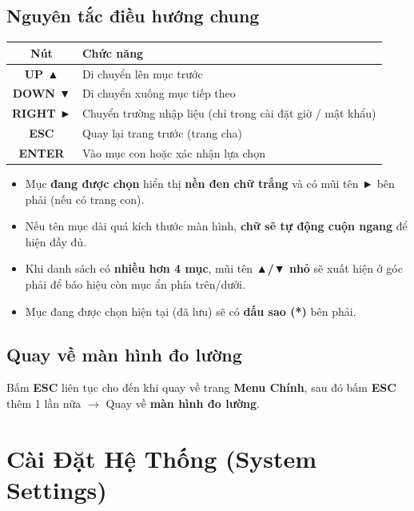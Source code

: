 \documentclass[12pt,a4paper]{article}
\begin{document}
\subsection{Nguyên tắc điều hướng chung}
\begin{table}[H]
\centering
\begin{tabularx}{\textwidth}{|c|X|}
\hline
\textbf{Nút} & \textbf{Chức năng} \\ \hline
\textbf{UP ▲} & Di chuyển lên mục trước \\ \hline
\textbf{DOWN ▼} & Di chuyển xuống mục tiếp theo \\ \hline
\textbf{RIGHT ►} & Chuyển trường nhập liệu (chỉ trong cài đặt giờ / mật khẩu) \\ \hline
\textbf{ESC} & Quay lại trang trước (trang cha) \\ \hline
\textbf{ENTER} & Vào mục con hoặc xác nhận lựa chọn \\ \hline
\end{tabularx}
\end{table}

\begin{tipbox}
\begin{itemize}[label={-}]
    \item Mục \textbf{đang được chọn} hiển thị \textbf{nền đen chữ trắng} và có mũi tên \textbf{►} bên phải (nếu có trang con).
    \item Nếu tên mục dài quá kích thước màn hình, \textbf{chữ sẽ tự động cuộn ngang} để hiện đầy đủ.
    \item Khi danh sách có \textbf{nhiều hơn 4 mục}, mũi tên \textbf{▲/▼ nhỏ} sẽ xuất hiện ở góc phải để báo hiệu còn mục ẩn phía trên/dưới.
    \item Mục đang được chọn hiện tại (đã lưu) sẽ có \textbf{dấu sao (*)} bên phải.
\end{itemize}
\end{tipbox}

\subsection{Quay về màn hình đo lường}
Bấm \textbf{ESC} liên tục cho đến khi quay về trang \textbf{Menu Chính}, sau đó bấm \textbf{ESC} thêm 1 lần nữa $\rightarrow$ Quay về \textbf{màn hình đo lường}.


\section{Cài Đặt Hệ Thống (System Settings)}
\end{document}
